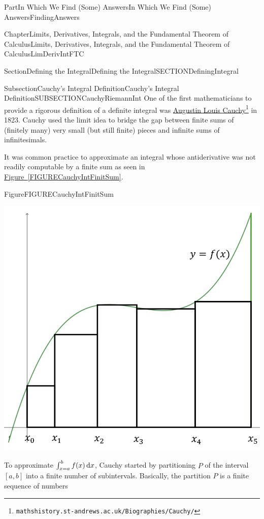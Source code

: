 \documentclass[oneside,10pt,]{book}
\newcommand{\xreffont}{\relax}
\numberwithin{equation}{part}
\newcommand{\dx}[1]{\,{\rm d}#1}
\begin{document}
\begin{partptx}{Part}{In Which We Find (Some) Answers}{}{In Which We Find (Some) Answers}{}{}{FindingAnswers}
\begin{chapterptx}{Chapter}{Limits, Derivatives, Integrals, and the Fundamental Theorem of Calculus}{}{Limits, Derivatives, Integrals, and the Fundamental Theorem of Calculus}{}{}{LimDerivIntFTC}
\begin{sectionptx}{Section}{Defining the Integral}{}{Defining the Integral}{}{}{SECTIONDefiningIntegral}
\typeout{************************************************}
%
\begin{subsectionptx}{Subsection}{Cauchy's Integral Definition}{}{Cauchy's Integral Definition}{}{}{SUBSECTIONCauchyRiemannInt}
One of the first mathematicians to provide a rigorous definition of a definite integral was \href{https://mathshistory.st-andrews.ac.uk/Biographies/Cauchy/}{Augustin Louis Cauchy}\footnote{\nolinkurl{mathshistory.st-andrews.ac.uk/Biographies/Cauchy/}\label{SUBSECTIONCauchyRiemannInt-2-2}} in 1823. Cauchy used the limit idea to bridge the gap between finite sums of (finitely many) very small (but still finite) pieces and infinite sums of infinitesimals.%
\par
It was common practice to approximate an integral whose antiderivative was not readily computable by a finite sum as seen in \hyperref[FIGURECauchyIntFinitSum]{Figure~{\xreffont\ref{FIGURECauchyIntFinitSum}}}.%
\begin{figureptx}{Figure}{}{FIGURECauchyIntFinitSum}{}%
\begin{image}{0.275}{0.45}{0.275}{}%
\includegraphics[width=\linewidth]{external/images/Integration2.png}
\end{image}%
\tcblower
\end{figureptx}%
To approximate \(\int^b_{x=a}{f(x)\dx{x}}\), Cauchy started by partitioning \(P\) of the interval\([a,b]\) into a finite number of subintervals.  Basically, the partition \(P\) is a finite sequence of numbers%

\end{subsectionptx}
\end{sectionptx}
\end{chapterptx}
\end{partptx}
\end{document}
